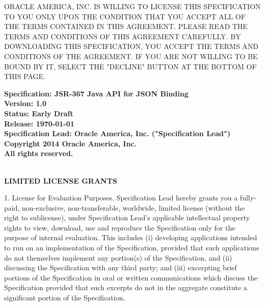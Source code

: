 \begin{flushleft}

ORACLE AMERICA, INC. IS WILLING TO LICENSE THIS SPECIFICATION TO YOU ONLY UPON THE
CONDITION THAT YOU ACCEPT ALL OF THE TERMS CONTAINED IN THIS AGREEMENT. PLEASE READ THE
TERMS AND CONDITIONS OF THIS AGREEMENT CAREFULLY. BY DOWNLOADING THIS SPECIFICATION,
YOU ACCEPT THE TERMS AND CONDITIONS OF THE AGREEMENT. IF YOU ARE NOT WILLING TO BE
BOUND BY IT, SELECT THE "DECLINE" BUTTON AT THE BOTTOM OF THIS PAGE.

{\bfseries Specification: JSR-367 Java API for JSON Binding \\
Version: 1.0 \\
Status: Early Draft \\
Release: \today\\ 
Specification Lead: Oracle America, Inc. ("Specification Lead")
Copyright 2014 Oracle America, Inc. \\
All rights reserved.
}

\mbox{}\\
{\bfseries LIMITED LICENSE GRANTS}

1. License for Evaluation Purposes. Specification Lead hereby grants you a fully-paid, 
non-exclusive, non-transferable, worldwide, limited license (without the right to sublicense), 
under Specification Lead's applicable intellectual property rights to view, download, 
use and reproduce the Specification only for the purpose of internal evaluation. This includes 
(i) developing applications intended to run on an implementation of the Specification, 
provided that such applications do not themselves implement any portion(s) of the Specification, and 
(ii) discussing the Specification with any third party; and 
(iii) excerpting brief portions of the Specification in oral or written communications 
which discuss the Specification provided that such excerpts do not in the aggregate 
constitute a significant portion of the Specification.


\end{flushleft}

